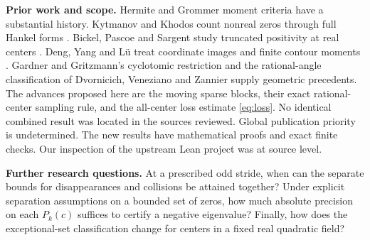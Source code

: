 \documentclass[11pt,letterpaper]{article}
\begin{document}
\textbf{Prior work and scope.} Hermite and Grommer moment criteria have a substantial history. Kytmanov and Khodos count nonreal zeros through full Hankel forms \cite{KK}. Bickel, Pascoe and Sargent study truncated positivity at real centers \cite{BPS}. Deng, Yang and L\"u treat coordinate images and finite contour moments \cite{DYL}. Gardner and Gritzmann's cyclotomic restriction \cite{GG} and the rational-angle classification of Dvornicich, Veneziano and Zannier \cite{DVZ} supply geometric precedents. The advances proposed here are the moving sparse blocks, their exact rational-center sampling rule, and the all-center loss estimate \eqref{eq:loss}. No identical combined result was located in the sources reviewed. Global publication priority is undetermined. The new results have mathematical proofs and exact finite checks. Our inspection of the upstream Lean project was at source level.

\textbf{Further research questions.} At a prescribed odd stride, when can the separate bounds for disappearances and collisions be attained together? Under explicit separation assumptions on a bounded set of zeros, how much absolute precision on each \(P_k(c)\) suffices to certify a negative eigenvalue? Finally, how does the exceptional-set classification change for centers in a fixed real quadratic field?
\end{document}
